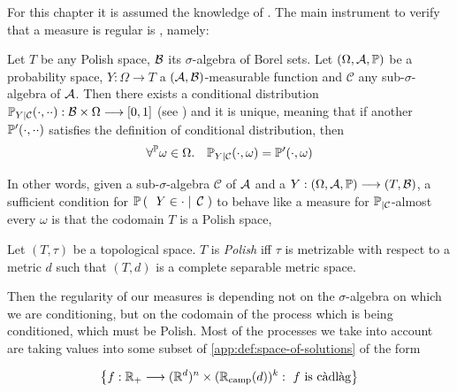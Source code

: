 For this chapter it is assumed the knowledge of \cite[Section 10.2]{dudley}.
The main instrument to verify that a measure is regular is \cite[Theorem 10.2.2]{dudley}, namely:

\begin{theorem}
	Let $T$ be any Polish space, $\Borel$ its $\sigma$-algebra of Borel sets.
	Let $(\Omega, \sigAlg, \Prb)$ be a probability space, $Y:\Omega\longrightarrow T$ a $(\sigAlg,\Borel)$-measurable function and $\mathcal{C}$ any sub-$\sigma$-algebra of $\sigAlg$.
	Then there exists a conditional distribution $\Prb_{Y|\mathcal{C}}(\cdot, \cdot \cdot):\Borel \times \Omega \longrightarrow [0,1]$ (see \cite[Chapter 10.2,first definition]{dudley}) and it is unique, meaning that if another $\Prb'(\cdot, \cdot \cdot)$ satisfies the definition of conditional distribution, then
	\begin{equation*}
		\forall^\Prb \omega\in\Omega.
		\quad
		\Prb_{Y|\mathcal{C}}(\cdot, \omega) = \Prb'(\cdot, \omega)
	\end{equation*}
\end{theorem}

In other words, given a sub-$\sigma$-algebra $\mathcal{C}$ of $\sigAlg$ and a \rv $Y:(\Omega, \sigAlg, \Prb) \longrightarrow (T,\Borel)$, a sufficient condition for $\PrbCond{Y \in \cdot}{\mathcal{C}}$ to behave like a measure for $\Prb_{|\mathcal{C}}$-almost every $\omega$ is that the codomain $T$ is a Polish space, \ie

\begin{definition}
	Let $(T, \tau)$ be a topological space. $T$ is \emph{Polish} iff $\tau$ is metrizable with respect to a metric $d$ such that $(T,d)$ is a complete separable metric space.
\end{definition}

Then the regularity of our measures is depending not on the $\sigma$-algebra on which we are conditioning, but on the codomain of the process which is being conditioned, which must be Polish.
Most of the processes we take into account are taking values into some subset of \ref{app:def:space-of-solutions} of the form

\begin{equation*}
	\left\{
	f:\R_+ \longrightarrow
	(\R^d)^n\times(\confCamp(d))^k
	:\
	f \text{ is \cadlag}
	\right\}
\end{equation*}


